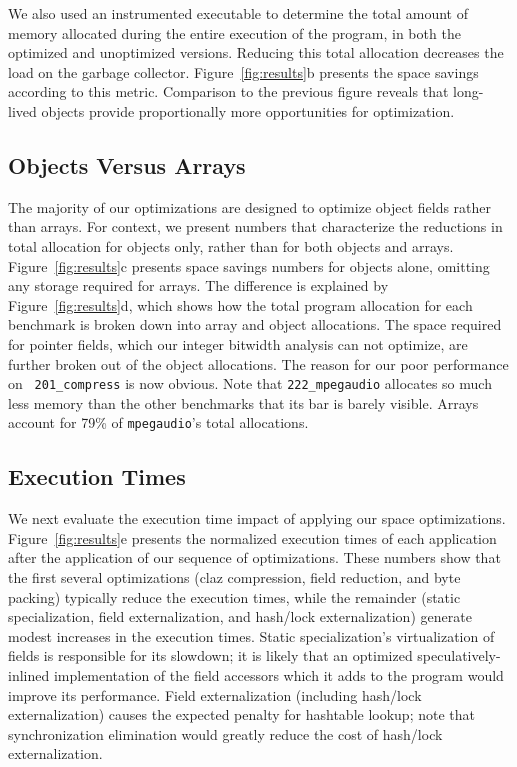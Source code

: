 \documentclass[oribibl]{llncs}
\begin{document}
We also used an instrumented executable to determine the total amount
of memory allocated during the entire execution of the program, in
both the optimized and unoptimized versions.  Reducing this total
allocation decreases the load on the garbage collector.
Figure~\ref{fig:results}b presents the space savings according to this
metric.  Comparison to the previous figure reveals that
long-lived objects provide proportionally more opportunities for
optimization.
%
\subsection{Objects Versus Arrays}
%
The majority of our optimizations are designed to optimize
object fields rather than arrays. For context, we present numbers 
that characterize the reductions in total allocation for objects only,
rather than for both objects and arrays. Figure~\ref{fig:results}c
presents space savings numbers for objects alone, omitting
any storage required for arrays.  The difference is explained by
Figure~\ref{fig:results}d, which shows how the total
program allocation for each benchmark is broken down into array and
object allocations.  The space required for pointer fields, which our
integer bitwidth analysis can not optimize, are further broken out of
the object allocations.
The reason for our poor performance on {\tt
  201\_compress} is now obvious.  Note that {\tt 222\_mpegaudio}
allocates so much less memory than the other benchmarks that its bar
is barely visible.  Arrays account for 79\% of {\tt mpegaudio}'s total
allocations.
%
\subsection{Execution Times} 
\label{sec:byte-pack}
%
We next evaluate the execution time impact of applying our space
optimizations. Figure~\ref{fig:results}e presents the normalized execution 
times of each application after the application of our sequence
of optimizations. These numbers show that the first several
optimizations (claz compression, field reduction, and byte packing)
typically reduce the execution times, while the
remainder (static specialization, field externalization, and  hash/lock
externalization) generate modest increases in the execution times. 
Static specialization's virtualization of fields is responsible for
its slowdown; it is likely that an optimized speculatively-inlined
implementation of the field accessors which it adds to the program
would improve its performance.  Field externalization (including
hash/lock externalization) causes the expected penalty for hashtable
lookup; note that synchronization elimination would greatly reduce the
cost of hash/lock externalization.
%
%
\end{document}
